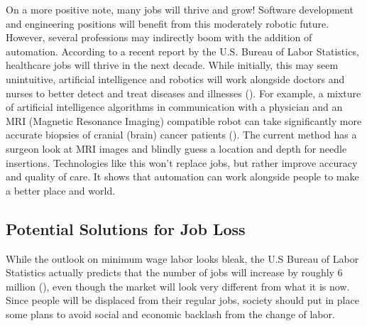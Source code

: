 On a more positive note, many jobs will thrive and grow! Software development and engineering positions will benefit from this moderately robotic future. However, several professions may indirectly boom with the addition of automation. According to a recent report by the U.S. Bureau of Labor Statistics, healthcare jobs will thrive in the next decade. While initially, this may seem unintuitive, artificial intelligence and robotics will work alongside doctors and nurses to better detect and treat diseases and illnesses  (\cite{USBLS_JobsIn10Years}). For example, a mixture of artificial intelligence algorithms in communication with a physician and an MRI (Magnetic Resonance Imaging) compatible robot can take significantly more accurate biopsies of cranial (brain) cancer patients (\cite{Fischer_MRI_Robot}). The current method has a surgeon look at MRI images and blindly guess a location and depth for needle insertions. Technologies like this won't replace jobs, but rather improve accuracy and quality of care. It shows that automation can work alongside people to make a better place and world.

\subsection{Potential Solutions for Job Loss}

While the outlook on minimum wage labor looks bleak, the U.S Bureau of Labor Statistics actually predicts that the number of jobs will increase by roughly 6 million (\cite{USBLS_JobsIn10Years}), even though the market will look very different from what it is now. Since people will be displaced from their regular jobs, society should put in place some plans to avoid social and economic backlash from the change of labor.

